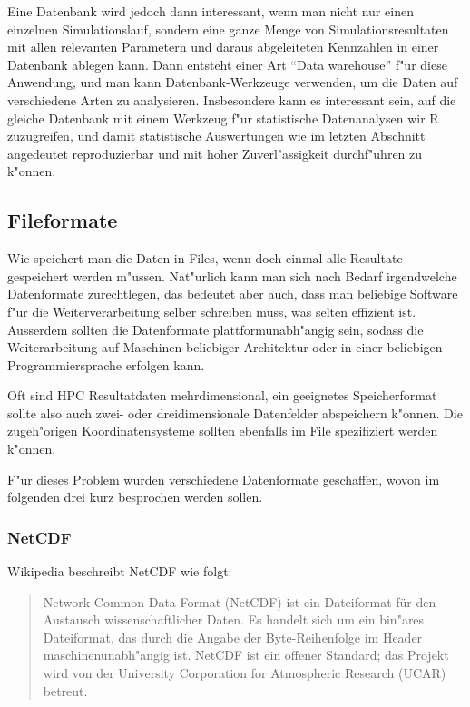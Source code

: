 Eine Datenbank wird jedoch dann interessant, wenn man nicht nur einen
einzelnen Simulationslauf, sondern eine ganze Menge von Simulationsresultaten
mit allen relevanten Parametern und daraus abgeleiteten Kennzahlen
in einer Datenbank ablegen kann.
Dann entsteht einer Art ``Data warehouse'' f"ur diese Anwendung,
und man kann Datenbank-Werkzeuge verwenden, um die Daten auf
verschiedene Arten zu analysieren. 
Insbesondere kann es interessant sein, auf die gleiche Datenbank
mit einem Werkzeug f"ur statistische Datenanalysen wir R zuzugreifen,
und damit statistische Auswertungen wie im letzten Abschnitt
angedeutet reproduzierbar und mit hoher Zuverl"assigkeit durchf"uhren
zu k"onnen.

\subsection{Fileformate}
Wie speichert man die Daten in Files, wenn doch einmal alle Resultate
gespeichert werden m"ussen.
Nat"urlich kann man sich nach Bedarf irgendwelche Datenformate zurechtlegen,
das bedeutet aber auch, dass man beliebige Software f"ur die
Weiterverarbeitung selber schreiben muss, was selten effizient ist.
Ausserdem sollten die Datenformate plattformunabh"angig sein,
sodass die Weiterarbeitung auf Maschinen beliebiger Architektur
oder in einer beliebigen Programmiersprache erfolgen kann.

Oft sind HPC Resultatdaten mehrdimensional, ein geeignetes Speicherformat
sollte also auch zwei- oder dreidimensionale Datenfelder abspeichern
k"onnen.
Die zugeh"origen Koordinatensysteme sollten ebenfalls im File
spezifiziert werden k"onnen.

F"ur dieses Problem wurden verschiedene Datenformate geschaffen, 
wovon im folgenden drei kurz besprochen werden sollen.

\subsubsection{NetCDF}
Wikipedia beschreibt NetCDF wie folgt:
\begin{quote}
Network Common Data Format (NetCDF) ist ein Dateiformat für den
Austausch wissenschaftlicher Daten. Es handelt sich um ein bin"ares
Dateiformat, das durch die Angabe der Byte-Reihenfolge im Header
maschinenunabh"angig ist. NetCDF ist ein offener Standard; das Projekt
wird von der University Corporation for Atmospheric Research (UCAR)
betreut.
\end{quote}

